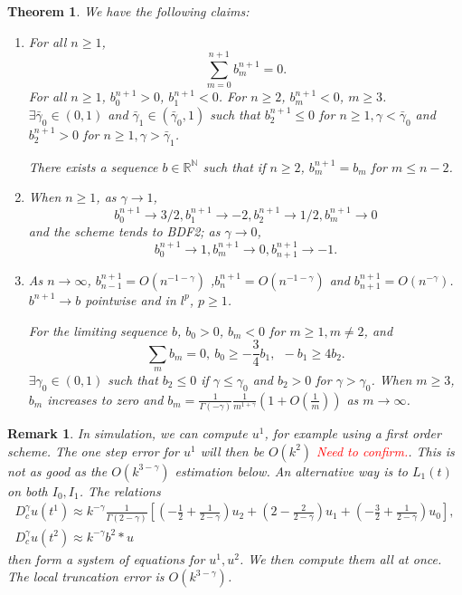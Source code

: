 \documentclass[11pt]{article} %
\newcommand{\tcr}[1]{\textcolor{red}{#1}}
\newtheorem{thm}{Theorem}
\newtheorem{rmk}{Remark}
\begin{document}
\begin{thm}
We have the following claims:
\begin{enumerate}
\item 
For all $n\ge 1$, $$
\sum_{m=0}^{n+1}b_m^{n+1}=0.
$$ 
For all $n\ge 1$, $b_0^{n+1}>0$, $b_1^{n+1}<0$. For $n\ge 2$, $b_m^{n+1}<0$, $m\ge 3$. $\exists \bar{\gamma}_0\in (0, 1)$ and $\bar{\gamma}_1\in(\bar{\gamma}_0, 1)$ such that $b_2^{n+1}\le 0$ for $n\ge 1, \gamma<\bar{\gamma}_0$ and $b_2^{n+1}>0$ for $n\ge 1, \gamma>\bar{\gamma}_1$.


There exists a sequence $b\in \mathbb{R}^{\mathbb{N}}$ such that if $n\ge 2$, $b_m^{n+1}=b_m$ for $m\le n-2$.

\item 
When $n\ge 1$, as $\gamma\to 1$, $$
b_0^{n+1}\to 3/2, b_1^{n+1}\to -2, b_2^{n+1}\to 1/2, b_m^{n+1}\to 0
$$
and the scheme tends to BDF2; as $\gamma\to 0$, $$
b_0^{n+1}\to 1, b_m^{n+1}\to 0 ,b_{n+1}^{n+1}\to -1.
$$
\item As $n\to \infty$, $b_{n-1}^{n+1}=O(n^{-1-\gamma})$ ,$b_n^{n+1}=O(n^{-1-\gamma})$ and $b_{n+1}^{n+1}=O(n^{-\gamma})$. $b^{n+1}\to b$ pointwise and in $l^p$, $p\ge 1$. 

For the limiting sequence $b$, $b_0>0$, $b_m<0$
for $m\ge 1, m\neq 2$, and $$
\sum_m b_m=0,\ 
b_0\ge -\frac{3}{4}b_1,\ \ -b_1\ge 4b_2.
$$
$\exists\gamma_0\in (0,1)$ such that $b_2\le 0$ if $\gamma\le \gamma_0$ and $b_2>0$ for $\gamma>\gamma_0$. 
When $m\ge 3$, $b_m$ increases to zero and $b_m=\frac{1}{\Gamma(-\gamma)}\frac{1}{m^{1+\gamma}}\left(1+O(\frac{1}{m})\right)$ as $m\to\infty$.
\end{enumerate}
\end{thm}

\begin{rmk}
In simulation, we can compute $u^1$, for example using a first order scheme. The one step error for $u^1$ will then be $O(k^2)$ \tcr{Need to confirm.}. This is not as good as the $O(k^{3-\gamma})$ estimation below. An alternative way is to $L_1(t)$ on both $I_0, I_1$. The relations 
\begin{gather*}
D_c^{\gamma}u(t^1)\approx k^{-\gamma}\frac{1}{\Gamma(2-\gamma)}[(-\frac{1}{2}
+\frac{1}{2-\gamma})u_2+(2-\frac{2}{2-\gamma})u_1+(-\frac{3}{2}+\frac{1}{2-\gamma})u_0],\\
D_c^{\gamma}u(t^2)\approx k^{-\gamma}b^{2}*u
\end{gather*}
then form a system of equations for $u^1, u^2$. We then compute them all at once. The local truncation error is $O(k^{3-\gamma})$.
\end{rmk}
\end{document}
